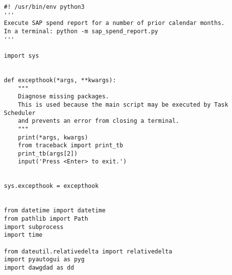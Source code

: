 \documentclass[10pt, letterpaper, twoside]{article}
\begin{document}
\begin{footnotesize}
\begin{verbatim}
#! /usr/bin/env python3
'''
Execute SAP spend report for a number of prior calendar months.
In a terminal: python -m sap_spend_report.py
'''

import sys


def excepthook(*args, **kwargs):
    """
    Diagnose missing packages.
    This is used because the main script may be executed by Task Scheduler
    and prevents an error from closing a terminal.
    """
    print(*args, kwargs)
    from traceback import print_tb
    print_tb(args[2])
    input('Press <Enter> to exit.')


sys.excepthook = excepthook


from datetime import datetime
from pathlib import Path
import subprocess
import time

from dateutil.relativedelta import relativedelta
import pyautogui as pyg
import dawgdad as dd



\end{verbatim}
\end{footnotesize}
\end{document}
